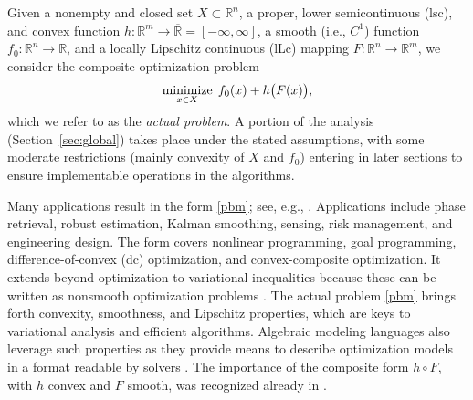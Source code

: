 \documentclass[smallextended,envcountsect]{svjour3}
\newcommand{\reals}{\mathbb{R}}
\newcommand{\Reals}{\overline{\mathbb{R}}}
\newcommand{\nnmin}{\mathop{\rm minimize}}
\begin{document}
Given a nonempty and closed set $X\subset \reals^n$, a proper, lower semicontinuous (lsc), and convex function $h:\reals^m\to \Reals = [-\infty,\infty]$, a smooth (i.e., $C^1$) function $f_0:\reals^n\to \reals$, and a locally Lipschitz continuous (lLc) mapping $F:\reals^n\to \reals^m$, we consider the composite optimization problem
\begin{equation}\label{pbm}
\nnmin_{x\in X}\; f_0(x) + h\big(F(x)\big),
\end{equation} 
which we refer to as the {\em actual problem}. A portion of the analysis (Section~\ref{sec:global}) takes place under the stated assumptions, with some moderate restrictions (mainly convexity of $X$ and $f_0$) entering in later sections to ensure implementable operations in the algorithms. 

Many applications result in the form \eqref{pbm}; see, e.g., \cite{AravkinBurkePillonetto.14,CuiPangSen.18,DuchiRuan.19,DavisDrusvyatskiyPaquette.20,CharisopoulosDavisDiazDrusvyatskiy.21,ByundeOliveiraRoyset.23,Ferris_Huber_Royset_2024,Royset.25,Sempere_Oliveira_Royset_2025}. Applications include phase retrieval, robust estimation, Kalman smoothing, sensing, risk management, and engineering design. The form covers nonlinear programming, goal programming, difference-of-convex (dc) optimization, and convex-composite optimization. It extends beyond optimization to variational inequalities because these can be written as nonsmooth optimization problems \cite{Ferris_Huber_Royset_2024,Royset.25}. The actual problem \eqref{pbm} brings forth convexity, smoothness, and Lipschitz properties, which are keys to variational analysis and efficient algorithms. Algebraic modeling languages also leverage such properties as they provide means to describe optimization models in a format readable by solvers \cite{Ferris_Huber_Royset_2024}. The importance of the composite form $h\circ F$, with $h$ convex and $F$ smooth, was recognized already in \cite{Powell.78a,Powell.78b}. 
\end{document}

